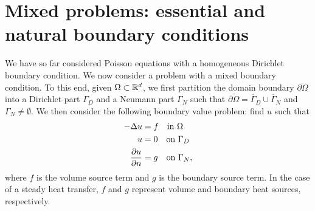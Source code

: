 \section{Mixed problems: essential and natural boundary conditions}
\label{sec:posnd_mixed}
We have so far considered Poisson equations with a homogeneous Dirichlet boundary condition.  We now consider a problem with a mixed boundary condition. To this end, given $\Omega \subset \mathbb{R}^d$, we first partition the domain boundary $\partial \Omega$ into a Dirichlet part $\Gamma_D$ and a Neumann part $\Gamma_N$ such that $\overline{\partial \Omega} = \overline \Gamma_D \cup \overline \Gamma_N$ and $\Gamma_N \neq \emptyset$.  We then consider the following boundary value problem: find $u$ such that
\begin{align}
  -\Delta u &= f \quad \text{in } \Omega \notag \\
  u &= 0 \quad \text{on } \Gamma_D \label{eq:posnd_mixed_bc_strong} \\
  \frac{\partial u}{\partial n} &= g \quad \text{on } \Gamma_N, \notag
\end{align}
where $f$ is the volume source term and $g$ is the boundary source term.  In the case of a steady heat transfer, $f$ and $g$ represent volume and boundary heat sources, respectively.

